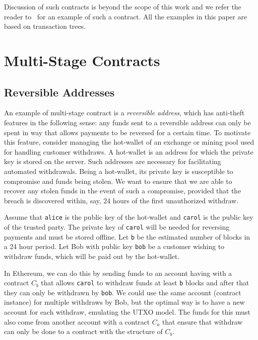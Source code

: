 \documentclass[runningheads]{llncs}
\begin{document}
Discussion of such contracts is beyond the scope of this work and we refer the reader to~\cite[Section 3.3.3]{advtutorial} for an example of such a contract. All the examples in this paper are based on transaction trees.

\section{Multi-Stage Contracts}
\subsection{Reversible Addresses}
\label{reversible}


An example of multi-stage contract is a {\em reversible address}, which has anti-theft features in the following sense: any funds sent to a reversible address can only be spent in way that allows payments to be reversed for a certain time. To motivate this feature, consider managing the hot-wallet of an exchange or mining pool used for handling customer withdraws. A hot-wallet is an address for which the private key is stored on the server. Such addresses are necessary for facilitating automated withdrawals. Being a hot-wallet, its private key is susceptible to compromise and funds being stolen. 
We want to ensure that we are able to recover any stolen funds in the event of such a compromise, provided that the breach is discovered within, say, 24 hours of the first unauthorized withdraw. %

Assume that \texttt{alice} is the public key of the hot-wallet and \texttt{carol} is the public key of the trusted party. The private key of \texttt{carol} will be needed for reversing payments and must be stored offline. Let \texttt{b} be the estimated number of blocks in a 24 hour period. 
Let Bob with public key \texttt{bob} be a customer wishing to withdraw funds, which will be paid out by the hot-wallet. 

In Ethereum, we can do this by sending funds to an account having with a contract $C_{b}$ that allows \texttt{carol} to withdraw funds at least \texttt{b} blocks and after that they can only be withdrawn by \texttt{bob}. We could use the same account (contract instance) for multiple withdraws by Bob, but the optimal way is to have a new account for each withdraw, emulating the UTXO model. The funds for this must also come from another account with a contract $C_{a}$ that ensure that withdraw can only be done to a contract with the structure of $C_{b}$. 
\end{document}
